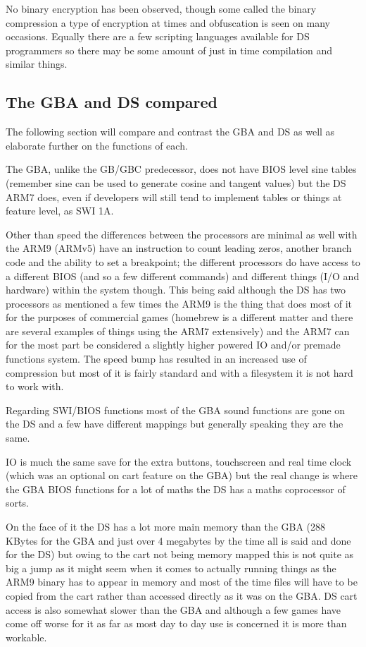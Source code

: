 \documentclass[
]{book}
\begin{document}
No binary encryption has been observed, though some called the binary compression a type of encryption at times and obfuscation is seen on many occasions. Equally there are a few scripting languages available for DS programmers so there may be some amount of just in time compilation and similar things.

\hypertarget{the-gba-and-ds-compared}{%
\subsection{The GBA and DS compared}\label{the-gba-and-ds-compared}}

The following section will compare and contrast the GBA and DS as well as elaborate further on the functions of each.

The GBA, unlike the GB/GBC predecessor, does not have BIOS level sine tables (remember sine can be used to generate cosine and tangent values) but the DS ARM7 does, even if developers will still tend to implement tables or things at feature level, as SWI 1A.

Other than speed the differences between the processors are minimal as well with the ARM9 (ARMv5) have an instruction to count leading zeros, another branch code and the ability to set a breakpoint; the different processors do have access to a different BIOS (and so a few different commands) and different things (I/O and hardware) within the system though. This being said although the DS has two processors as mentioned a few times the ARM9 is the thing that does most of it for the purposes of commercial games (homebrew is a different matter and there are several examples of things using the ARM7 extensively) and the ARM7 can for the most part be considered a slightly higher powered IO and/or premade functions system. The speed bump has resulted in an increased use of compression but most of it is fairly standard and with a filesystem it is not hard to work with.

Regarding SWI/BIOS functions most of the GBA sound functions are gone on the DS and a few have different mappings but generally speaking they are the same.

IO is much the same save for the extra buttons, touchscreen and real time clock (which was an optional on cart feature on the GBA) but the real change is where the GBA BIOS functions for a lot of maths the DS has a maths coprocessor of sorts.

On the face of it the DS has a lot more main memory than the GBA (288 KBytes for the GBA and just over 4 megabytes by the time all is said and done for the DS) but owing to the cart not being memory mapped this is not quite as big a jump as it might seem when it comes to actually running things as the ARM9 binary has to appear in memory and most of the time files will have to be copied from the cart rather than accessed directly as it was on the GBA. DS cart access is also somewhat slower than the GBA and although a few games have come off worse for it as far as most day to day use is concerned it is more than workable.
\end{document}

